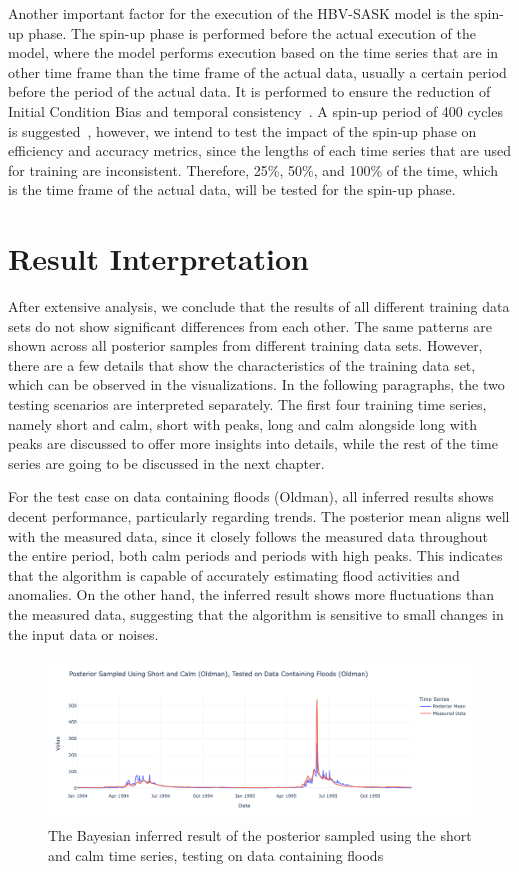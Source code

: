 Another important factor for the execution of the HBV-SASK model is the spin-up phase. The spin-up phase is performed before the actual execution of the model, where the model performs execution based on the time series that are in other time frame than the time frame of the actual data, usually a certain period before the period of the actual data. It is performed to ensure the reduction of Initial Condition Bias and temporal consistency~\cite{spin_up_explanation}. A spin-up period of 400 cycles is suggested~\cite{spin_up_explanation}, however, we intend to test the impact of the spin-up phase on efficiency and accuracy metrics, since the lengths of each time series that are used for training are inconsistent. Therefore, 25\%, 50\%, and 100\% of the time, which is the time frame of the actual data, will be tested for the spin-up phase.

\section{Result Interpretation}
After extensive analysis, we conclude that the results of all different training data sets do not show significant differences from each other. The same patterns are shown across all posterior samples from different training data sets. However, there are a few details that show the characteristics of the training data set, which can be observed in the visualizations. In the following paragraphs, the two testing scenarios are interpreted separately. The first four training time series, namely short and calm, short with peaks, long and calm alongside long with peaks are discussed to offer more insights into details, while the rest of the time series are going to be discussed in the next chapter.

For the test case on data containing floods (Oldman), all inferred results shows decent performance, particularly regarding trends. The posterior mean aligns well with the measured data, since it closely follows the measured data throughout the entire period, both calm periods and periods with high peaks. This indicates that the algorithm is capable of accurately estimating flood activities and anomalies. On the other hand, the inferred result shows more fluctuations than the measured data, suggesting that the algorithm is sensitive to small changes in the input data or noises.

\begin{figure}[H]
    \centering
    \includegraphics[width=.7\textwidth]{figures/time_series_analysis/ts_int/0_1.png}
    \captionsetup{width=.8\textwidth}
    \caption{The Bayesian inferred result of the posterior sampled using the short and calm time series, testing on data containing floods}
    \label{fig:enter-label}
\end{figure}

